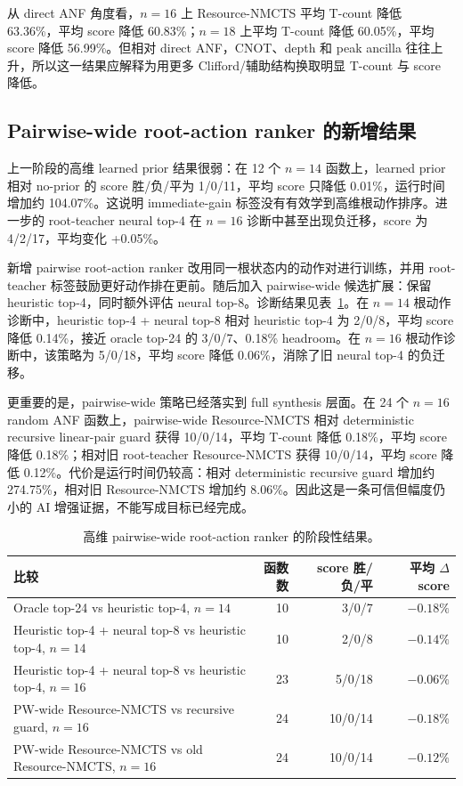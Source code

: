 \documentclass[UTF8,fontset=macnew,11pt]{ctexart}
\newcommand{\method}{Resource-NMCTS}
\begin{document}
从 direct ANF 角度看，$n=16$ 上 \method{} 平均 T-count 降低 63.36\%，平均 score 降低 60.83\%；$n=18$ 上平均 T-count 降低 60.05\%，平均 score 降低 56.99\%。但相对 direct ANF，CNOT、depth 和 peak ancilla 往往上升，所以这一结果应解释为用更多 Clifford/辅助结构换取明显 T-count 与 score 降低。

\subsection{Pairwise-wide root-action ranker 的新增结果}

上一阶段的高维 learned prior 结果很弱：在 12 个 $n=14$ 函数上，learned prior 相对 no-prior 的 score 胜/负/平为 1/0/11，平均 score 只降低 0.01\%，运行时间增加约 104.07\%。这说明 immediate-gain 标签没有有效学到高维根动作排序。进一步的 root-teacher neural top-4 在 $n=16$ 诊断中甚至出现负迁移，score 为 4/2/17，平均变化 +0.05\%。

新增 pairwise root-action ranker 改用同一根状态内的动作对进行训练，并用 root-teacher 标签鼓励更好动作排在更前。随后加入 pairwise-wide 候选扩展：保留 heuristic top-4，同时额外评估 neural top-8。诊断结果见表~\ref{tab:pairwise}。在 $n=14$ 根动作诊断中，heuristic top-4 + neural top-8 相对 heuristic top-4 为 2/0/8，平均 score 降低 0.14\%，接近 oracle top-24 的 3/0/7、0.18\% headroom。在 $n=16$ 根动作诊断中，该策略为 5/0/18，平均 score 降低 0.06\%，消除了旧 neural top-4 的负迁移。

更重要的是，pairwise-wide 策略已经落实到 full synthesis 层面。在 24 个 $n=16$ random ANF 函数上，pairwise-wide \method{} 相对 deterministic recursive linear-pair guard 获得 10/0/14，平均 T-count 降低 0.18\%，平均 score 降低 0.18\%；相对旧 root-teacher \method{} 获得 10/0/14，平均 score 降低 0.12\%。代价是运行时间仍较高：相对 deterministic recursive guard 增加约 274.75\%，相对旧 \method{} 增加约 8.06\%。因此这是一条可信但幅度仍小的 AI 增强证据，不能写成目标已经完成。

\begin{table}[t]
\centering
\small
\caption{高维 pairwise-wide root-action ranker 的阶段性结果。}
\label{tab:pairwise}
\begin{tabularx}{\linewidth}{>{\raggedright\arraybackslash}Xrrr}
\toprule
比较 & 函数数 & score 胜/负/平 & 平均 $\Delta$ score \\
\midrule
Oracle top-24 vs heuristic top-4, $n=14$ & 10 & 3/0/7 & $-0.18\%$ \\
Heuristic top-4 + neural top-8 vs heuristic top-4, $n=14$ & 10 & 2/0/8 & $-0.14\%$ \\
Heuristic top-4 + neural top-8 vs heuristic top-4, $n=16$ & 23 & 5/0/18 & $-0.06\%$ \\
PW-wide \method{} vs recursive guard, $n=16$ & 24 & 10/0/14 & $-0.18\%$ \\
PW-wide \method{} vs old \method{}, $n=16$ & 24 & 10/0/14 & $-0.12\%$ \\
\bottomrule
\end{tabularx}
\end{table}
\end{document}

